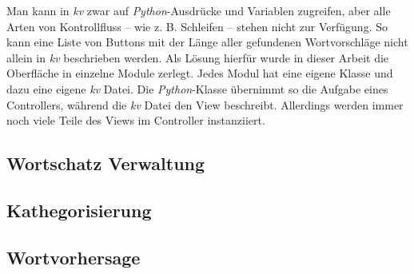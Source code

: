         Man kann in \emph{kv} zwar auf \emph{Python}-Ausdrücke und Variablen zugreifen, aber alle Arten von Kontrollfluss  – wie z. B. Schleifen – stehen nicht zur Verfügung. So kann eine Liste von Buttons mit der Länge aller gefundenen Wortvorschläge nicht allein in \emph{kv} beschrieben werden. Als Lösung hierfür wurde in dieser Arbeit die Oberfläche in einzelne Module zerlegt. Jedes Modul hat eine eigene Klasse und dazu eine eigene \emph{kv} Datei. Die \emph{Python}-Klasse übernimmt so die Aufgabe eines Controllers, während die \emph{kv} Datei den View beschreibt. Allerdings werden immer noch viele Teile des Views im Controller instanziiert.
        
	\newpage
    \subsection{Wortschatz Verwaltung}
	\subsection{Kathegorisierung}
	\subsection{Wortvorhersage}
    \newpage